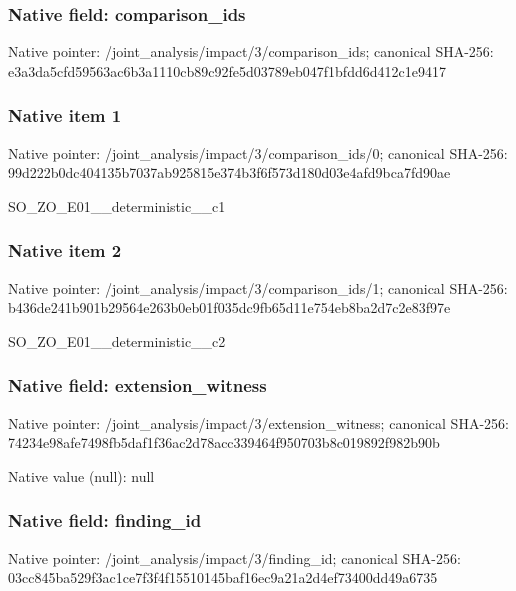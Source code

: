 \documentclass[10pt,a4paper]{article}
\begin{document}
\subsubsection{Native field: comparison\_\allowbreak{}ids}
Native pointer: /joint\_\allowbreak{}analysis/impact/3/comparison\_\allowbreak{}ids; canonical SHA-256: e3a3da5cfd59563ac6b3a1110cb89c92fe5d03789eb047f1bfdd6d412c1e9417

\subsubsection{Native item 1}
Native pointer: /joint\_\allowbreak{}analysis/impact/3/comparison\_\allowbreak{}ids/0; canonical SHA-256: 99d222b0dc404135b7037ab925815e374b3f6f573d180d03e4afd9bca7fd90ae

\begingroup\raggedright\sloppy SO\_\allowbreak{}ZO\_\allowbreak{}E01\_\allowbreak{}\_\allowbreak{}deterministic\_\allowbreak{}\_\allowbreak{}c1\par\endgroup

\subsubsection{Native item 2}
Native pointer: /joint\_\allowbreak{}analysis/impact/3/comparison\_\allowbreak{}ids/1; canonical SHA-256: b436de241b901b29564e263b0eb01f035dc9fb65d11e754eb8ba2d7c2e83f97e

\begingroup\raggedright\sloppy SO\_\allowbreak{}ZO\_\allowbreak{}E01\_\allowbreak{}\_\allowbreak{}deterministic\_\allowbreak{}\_\allowbreak{}c2\par\endgroup

\subsubsection{Native field: extension\_\allowbreak{}witness}
Native pointer: /joint\_\allowbreak{}analysis/impact/3/extension\_\allowbreak{}witness; canonical SHA-256: 74234e98afe7498fb5daf1f36ac2d78acc339464f950703b8c019892f982b90b

Native value (null): null

\subsubsection{Native field: finding\_\allowbreak{}id}
Native pointer: /joint\_\allowbreak{}analysis/impact/3/finding\_\allowbreak{}id; canonical SHA-256: 03cc845ba529f3ac1ce7f3f4f15510145baf16ec9a21a2d4ef73400dd49a6735
\end{document}
